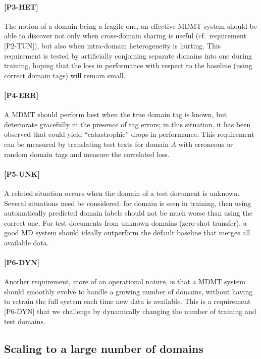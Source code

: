\documentclass[11pt,a4paper]{article}
\newcommand{\fyTodo}[1]{\Todo[FY:]{\textcolor{orange}{#1}}}
\newcommand{\fyDone}[1]{\done[FY]\Todo[FY:]{\textcolor{orange}{#1}}}
\newcommand{\jcDone}[1]{\done[JC]\Todo[JC:]{\textcolor{blue}{#1}}}
\begin{document}
\paragraph{[P3-HET]}
The notion of a domain being a fragile one, an effective MDMT system should be able to discover not only when cross-domain sharing is useful (cf.\ requirement [P2-TUN])\jcDone{what is P2.2?}, but also when intra-domain heterogeneity is hurting. This requirement is tested by artificially conjoining separate domains into one during training, hoping that the loss in performance with respect to the baseline (using correct domain tags) will remain small.

\paragraph{[P4-ERR]}
A MDMT should perform best when the true domain tag is known, but deteriorate gracefully in the presence of tag errors; in this situation, it has been observed that could yield ``catastrophic'' drops in performance. This requirement can be measured by translating test texts for domain $A$ with erroneous or random domain tags and measure the correlated loss.

\paragraph{[P5-UNK]}
A related situation occurs when the domain of a test document is unknown. Several situations need be considered: for domain is seen in training, then using automatically predicted domain labels should not be much worse than using the correct one. For test documents from unknown domains (zero-shot transfer), a good MD system should ideally outperform the default baseline that merges all available data.\fyDone{Systems react to unknown domains}

\paragraph{[P6-DYN]}
Another requirement, more of an operational nature, is that a MDMT system should smoothly evolve to handle a growing number of domains, without having to retrain the full system each time new data is available. This is a requirement [P6-DYN] that we challenge by dynamically changing the number of training and test domains.

\subsection{Scaling to a large number of domains \label{ssec:scaling}}
\end{document}
